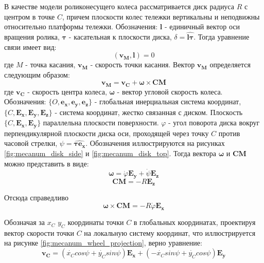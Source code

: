 \documentclass[oneside,final,14pt]{extreport}
\newcommand{\bs}{\boldsymbol}
\begin{document}
 В качестве модели роликонесущего колеса рассматривается диск радиуса $R$ с центром в точке $C$, причем плоскости колес тележки вертикальны и неподвижны относительно платформы тележки\cite{MecanumWheel}. Обозначения: $\bs{l}$ - единичный вектор оси вращения ролика, $\bs{\tau}$ - касательная к плоскости диска, $\delta = \widehat{\bs{l} \bs{\tau}}$. Тогда уравнение связи имеет вид:
\begin{equation}
(
\bs{v_{M}}
,
\bs{l}
)
=
0
\end{equation}
где $M$ - точка касания, $\bs{v_{M}}$ - скорость точки касания. Вектор $\bs{v_{M}}$ определяется следующим образом:
\begin{equation}
\bs{v_{M}}
=
\bs{v_{C}}
+
\bs{\omega}
\times
\bs{CM}
\end{equation}
где
$\bs{v_{C}}$ -   
скорость центра колеса, $\bs{\omega}$ - вектор угловой скорость колеса.
Обозначения: $\{O,\bs{e_{x}},\bs{e_{y}},\bs{e_{z}}\}$ - глобальная инерциальная система координат, $\{C,\bs{E_{x}},\bs{E_{y}},\bs{E_{z}}\}$ - система координат, жестко связанная с диском. Плоскость $\{C,\bs{E_{x}},\bs{E_{y}}\}$ параллельна плоскости поверхности.  $\varphi$ - угол поворота диска вокруг перпендикулярной плоскости диска оси, проходящей через точку $C$ против часовой стрелки, $\psi = \widehat{\bs{\tau} \bs{e_{x}}}$. Обозначения иллюстрируются на рисунках \ref{fig:mecanum_disk_side} и \ref{fig:mecanum_disk_top}. Тогда вектора $\bs{\omega}$ и $\bs{CM}$ можно представить в виде:
\begin{equation}
\bs{\omega}
=
\dot{\varphi}
\bs{E_{y}}
+
\dot{\psi}
\bs{E_{z}}
\end{equation}
\begin{equation}
\bs{CM}
=
-R
\bs{E_{z}}
\end{equation}

Отсюда справедливо
\begin{equation}
\bs{\omega}
\times
\bs{CM}
=
-R\dot{\varphi}
\bs{E_{x}}
\end{equation} 

Обозначая за $x_{C}$ $y_{C}$ координаты точки $C$ в глобальных координатах, проектируя вектор скорости точки $C$ на локальную систему координат, что иллюстрируется на рисунке \ref{fig:mecanum_wheel_projection}, верно уравнение:
\begin{equation}
\label{eq:velocity_c_projection}
\bs{v_{C}}
=
(
\dot{x_{C}}
cos\psi
+
\dot{y_{C}}
sin\psi
)
\bs{E_{x}}
+
(
-\dot{x_{C}}
sin\psi
+
\dot{y_{C}}
cos\psi
)
\bs{E_{y}}
\end{equation}
\end{document}
